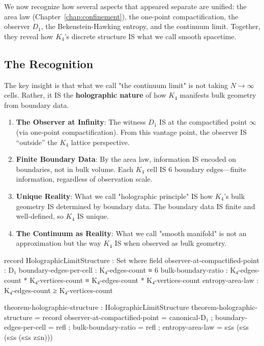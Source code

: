 \documentclass[11pt,a4paper]{book}
\begin{document}
We now recognize how several aspects that appeared separate are unified: the area law 
(Chapter~\ref{chap:confinement}), the one-point compactification, the observer $D_1$, 
the Bekenstein-Hawking entropy, and the continuum limit. Together, they reveal how $K_4$'s discrete structure IS what we call smooth spacetime.

\subsection{The Recognition}

The key insight is that what we call "the continuum limit" is not taking $N \to \infty$ 
cells. Rather, it IS the \textbf{holographic nature} of how $K_4$ manifests bulk geometry from boundary data.

\begin{enumerate}
\item \textbf{The Observer at Infinity}: The witness $D_1$ IS at the compactified 
point $\infty$ (via one-point compactification). From this vantage point, the observer 
IS ``outside'' the $K_4$ lattice perspective.

\item \textbf{Finite Boundary Data}: By the area law, information IS encoded on boundaries, 
not in bulk volume. Each $K_4$ cell IS 6 boundary edges---finite information, 
regardless of observation scale.

\item \textbf{Unique Reality}: What we call "holographic principle" IS how $K_4$'s bulk geometry 
IS determined by boundary data. The boundary data IS finite and well-defined, so 
$K_4$ IS unique.

\item \textbf{The Continuum as Reality}: What we call "smooth manifold" is not an approximation but 
the way $K_4$ IS when observed as bulk geometry.
\end{enumerate}

\begin{code}
record HolographicLimitStructure : Set where
  field
    observer-at-compactified-point : D₁
    boundary-edges-per-cell : K₄-edges-count ≡ 6
    bulk-boundary-ratio : K₄-edges-count * K₄-vertices-count ≡ K₄-edges-count * K₄-vertices-count
    entropy-area-law : K₄-edges-count ≥ K₄-vertices-count

theorem-holographic-structure : HolographicLimitStructure
theorem-holographic-structure = record
  { observer-at-compactified-point = canonical-D₁
  ; boundary-edges-per-cell = refl
  ; bulk-boundary-ratio = refl
  ; entropy-area-law = s≤s (s≤s (s≤s (s≤s z≤n)))
  }
\end{code}
\end{document}
